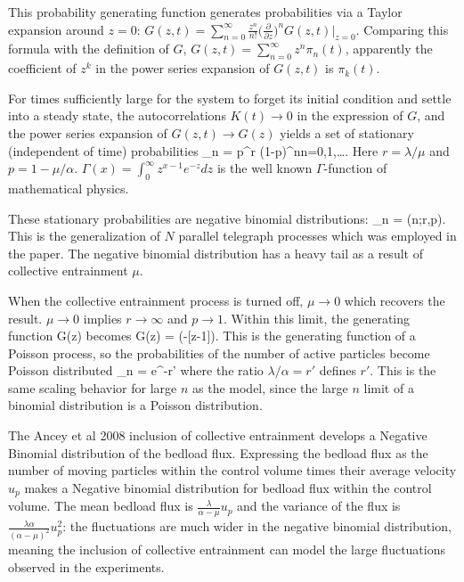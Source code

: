 This probability generating function generates probabilities via a Taylor expansion around $z=0$: $G(z,t) = \sum_{n=0}^\infty \frac{z^n}{n!}\big(\frac{\partial}{\partial z}\big)^n G(z,t) |_{z=0}$. Comparing this formula with the definition of $G$, $G(z,t) = \sum_{n=0}^\infty z^n \pi_n(t)$, apparently the coefficient of $z^k$ in the power series expansion of $G(z,t)$ is $\pi_k(t)$. 

For times sufficiently large for the system to forget its initial condition and settle into a steady state, the autocorrelations $K(t)\rightarrow 0 $ in the expression of $G$, and the power series expansion of $G(z,t) \rightarrow G(z)$ yields a set of stationary (independent of time) probabilities 
\be \pi_n =  p^r (1-p)^n\text{, }n=0,1,\dots.\ee
Here $r=\lambda/\mu$ and $p = 1-\mu/\alpha$. $\Gamma(x) = \int_0^\infty z ^{x-1} e^{-z} dz$ is the well known $\Gamma$-function of mathematical physics.  

These stationary probabilities are negative binomial distributions: 
\be \pi_n = (n;r,p).\ee
This is the generalization of $N$ parallel telegraph processes which was employed in the \citet{Ancey2006} paper. 
The negative binomial distribution has a heavy tail as a result of collective entrainment $\mu$.

When the collective entrainment process is turned off, $\mu\rightarrow 0$ which recovers the \citet{Ancey2006} result. 
$\mu\rightarrow 0$ implies $r \rightarrow \infty$ and $p \rightarrow 1$. 
Within this limit, the generating function G(z) becomes 
\be G(z) = \exp(-\frac{\lambda}{\alpha}[z-1]).\ee
This is the generating function of a Poisson process, so the probabilities of the number of active particles become Poisson distributed 
\be \pi_n = e^{-r'}\ee
where the ratio $\lambda/\alpha = r'$ defines $r'$. 
This is the same scaling behavior for large $n$ as the \citet{Ancey2006} model, since the large $n$ limit of a binomial distribution is a Poisson distribution. 

The Ancey et al 2008 inclusion of collective entrainment develops a Negative Binomial distribution of the bedload flux. 
Expressing the bedload flux as the number of moving particles within the control volume times their average velocity $u_p$ makes a Negative binomial distribution for bedload flux within the control volume. The mean bedload flux is $ \frac{\lambda}{\alpha-\mu} u_p $ and the variance of the flux is $ \frac{\lambda \alpha}{(\alpha-\mu)^2} u_p^2$: the fluctuations are much wider in the negative binomial distribution, meaning the inclusion of collective entrainment can model the large fluctuations observed in the \citet{Ancey2008} experiments. 

